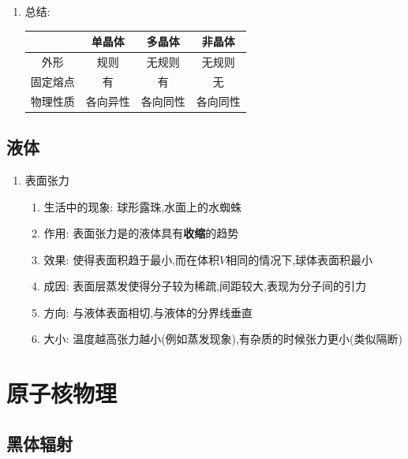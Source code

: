 \documentclass{article}
\begin{document}
\begin{enumerate}
    \item 总结:

          \hspace{3em}\begin{tabular}{|c|c|c|c|}
              \hline
                   & 单晶体  & 多晶体  & 非晶体  \\
              \hline
              外形   & 规则   & 无规则  & 无规则  \\
              \hline
              固定熔点 & 有    & 有    & 无    \\
              \hline
              物理性质 & 各向异性 & 各向同性 & 各向同性 \\
              \hline
          \end{tabular}
\end{enumerate}

\vspace{2em}

\subsection{液体}
\begin{enumerate}
    \item 表面张力
    \begin{enumerate}[label = (\arabic*)]
        \item 生活中的现象: 球形露珠,水面上的水蜘蛛
        \item 作用: 表面张力是的液体具有\textbf{收缩}的趋势
        \item 效果: 使得表面积趋于最小,而在体积$V$相同的情况下,球体表面积最小
        \item 成因: 表面层蒸发使得分子较为稀疏,间距较大,表现为分子间的引力
        \item 方向: 与液体表面相切,与液体的分界线垂直
        \item 大小: 温度越高张力越小(例如蒸发现象),有杂质的时候张力更小(类似隔断)
    \end{enumerate}
\end{enumerate}

\vspace{2em}

\section{原子核物理}
\subsection{黑体辐射}
\end{document}
